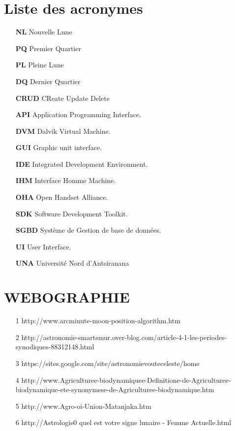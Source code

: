 \documentclass[a4paper, 12pt]{report}
\begin{document}
\chapter*{Liste des acronymes}
\begin{itemize}
\item [\textbf{NL}] Nouvelle Lune
\item [\textbf{PQ}] Premier Quartier
\item [\textbf{PL}] Pleine Lune
\item [\textbf{DQ}] Dernier Quartier
\item [\textbf{CRUD}] CReate Update Delete
\item [\textbf{API}] Application Programming Interface.
\item [\textbf{DVM}] Dalvik Virtual Machine.
\item [\textbf{GUI}] Graphic unit interface.
\item [\textbf{IDE}] Integrated Development Environment.
\item [\textbf{IHM}] Interface Homme Machine.
\item [\textbf{OHA}] Open Handset Alliance.
\item [\textbf{SDK}] Software Development Toolkit.
\item [\textbf{SGBD}] Système de Gestion de base de données.
\item [\textbf{UI}] User Interface.
\item [\textbf{UNA }] Université Nord d'Antsiranana
\end{itemize}


\newpage
{}
\nocite{*} 


\chapter*{WEBOGRAPHIE}
\begin{itemize}
\item [1] http://www.arcminute-moon-position-algorithm.htm
\item [2] http://astronomie-smartsmur.over-blog.com/article-4-1-les-periodes-synodiques-88312148.html
\item [3] https://sites.google.com/site/astronomievouteceleste/home
\item [4] http://www.Agriculturee-biodynamiquee-Definitione-de-Agriculturee-biodynamique-ete-synonymese-de-Agriculturee-biodynamique.htm
\item [5] http://www.Agro-oi-Union-Matanjaka.htm
\item [6] http://Astrologie0 quel est votre signe lunaire - Femme Actuelle.html
\end{itemize}

\let\oldclearpage\clearpage
\newpage
	\begin{appendix}
	\end{appendix}
	
\end{document}
